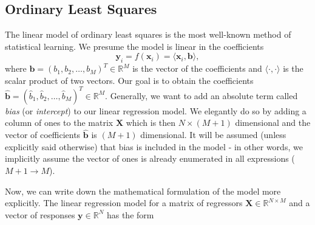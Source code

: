 \documentclass[11pt,oneside,czech,american]{book} %
\theoremstyle{definition} %
\theoremstyle{definition}
\begin{document}
\subsection{Ordinary Least Squares}
The linear model of ordinary least squares is the most well-known method of statistical learning. We presume the model is linear in the coefficients
\begin{equation}
	\bm{y}_{i} = f(\bm{x}_{i})= \langle\bm{x}_{i}, \bm{b}\rangle,
\end{equation}
where $\bm{b}= (b_{1},b_{2},\dots,b_{M})^{T} \in \mathbb{R}^{M}$ is the vector of the coefficients and $\langle \cdot , \cdot \rangle$ is the scalar product of two vectors. Our goal is to obtain the coefficients $\bm{\hat{b}}= (\hat{b}_{1},\hat{b}_{2},\dots,\hat{b}_{M})^{T} \in \mathbb{R}^{M}$. Generally, we want to add an absolute term called \textit{bias} (or \textit{intercept}) to our linear regression model. We elegantly do so by adding a column of ones to the matrix  $\bm{X}$ which is then $N\times (M+1)$ dimensional and the vector of coefficients $\bm{\hat{b}}$ is $(M+1)$ dimensional. It will be assumed (unless explicitly said otherwise) that bias is included in the model - in other words, we implicitly assume the vector of ones is already enumerated in all expressions ($M+1 \rightarrow M$).

Now, we can write down the mathematical formulation of the model more explicitly. The linear regression model for a matrix of regressors $\bm{X} \in \mathbb{R}^{N \times M}$ and a vector of responses $\bm{y} \in \mathbb{R}^{N}$ has the form
\end{document}
